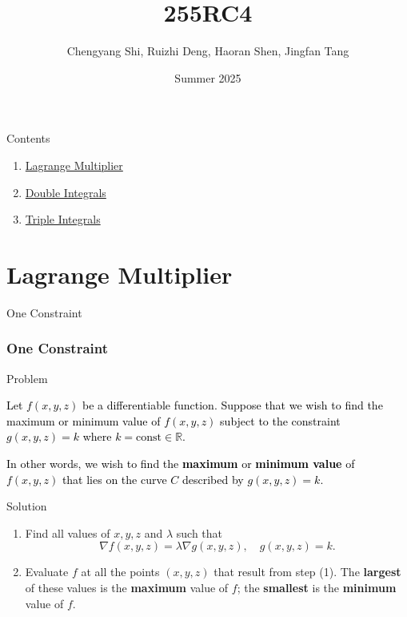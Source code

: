 \documentclass[aspectratio=169, UTF8]{beamer}
\title{\LARGE 255RC4}
\author{Chengyang Shi, Ruizhi Deng, Haoran Shen, Jingfan Tang}
\date{Summer 2025}
\begin{document}
\maketitle



\begin{frame}{Contents}
    \begin{enumerate}
        \item \hyperlink{0}{Lagrange Multiplier}
        \item \hyperlink{1}{Double Integrals}
        \item \hyperlink{2}{Triple Integrals}
    \end{enumerate}

\end{frame}



\section{Lagrange Multiplier}
\label{0}
\begin{frame}{One Constraint}
    \frametitle{One Constraint}
    \begin{block}{Problem}
        \textcolor{black}{Let $f(x, y, z)$ be a differentiable function. Suppose that we wish to find the maximum or minimum value of $f(x, y, z)$ subject to the constraint $g(x, y, z) = k$ where $k = \text{const} \in \mathbb{R}$. \colorbox{highlighttrans}{\parbox{0.98\linewidth}{In other words, we wish to find the \textbf{maximum} or \textbf{minimum value} of $f(x, y, z)$ that lies on the curve $C$ described by $g(x, y, z) = k$.}}}
    \end{block}
    \begin{block}{Solution}
        \begin{enumerate}
            \item Find all values of $x, y, z$ and $\lambda$ such that
                  \[
                      \boxed{\nabla f(x, y, z) = \lambda \nabla g(x, y, z), \quad g(x, y, z) = k.}
                  \]
            \item Evaluate $f$ at all the points $(x, y, z)$ that result from step (1). The \textbf{largest} of these values is the \textbf{maximum} value of $f$; the \textbf{smallest} is the \textbf{minimum} value of $f$.
        \end{enumerate}
    \end{block}
\end{frame}
\end{document}
